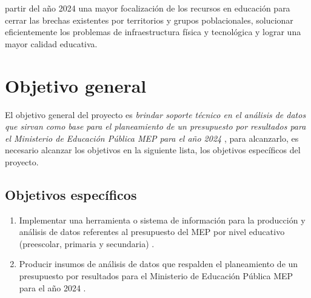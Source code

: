 \documentclass[a4paper, 9pt, conference]{article}              %
\theoremstyle{definition}
\begin{document}
partir del a\~no 2024 una mayor focalizaci\'on de los recursos en educaci\'on para cerrar las brechas existentes por territorios y grupos poblacionales, solucionar eficientemente los problemas de infraestructura f\'isica y tecnol\'ogica y lograr una mayor calidad educativa.



\section{Objetivo general} \label{sec:goal}

El objetivo general del proyecto es \emph{brindar soporte t\'ecnico en el an\'alisis de datos que sirvan como base para el planeamiento de un presupuesto por resultados para el Ministerio de Educaci\'on P\'ublica MEP para el a\~no 2024} \cite{trd}, para alcanzarlo, es necesario alcanzar los objetivos en la siguiente lista, los objetivos
espec\'ificos del proyecto.

\subsection{Objetivos espec\'ificos} \label{sec:subgoals}

\begin{enumerate}
	\item Implementar una herramienta o sistema de informaci\'on para la producci\'on y an\'alisis de datos referentes al presupuesto del MEP por nivel educativo (preescolar, primaria y secundaria) \cite{trd}.
	\item Producir insumos de an\'alisis de datos que respalden el planeamiento de un presupuesto por resultados para el Ministerio de Educaci\'on P\'ublica MEP para el a\~no 2024 \cite{trd}.
\end{enumerate}
\end{document}

